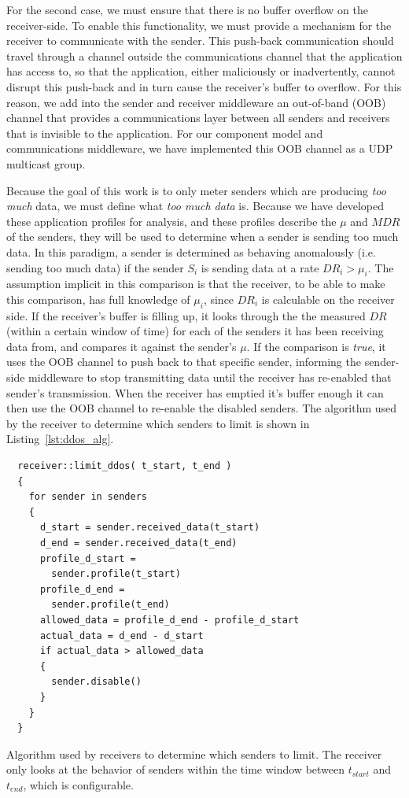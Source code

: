 For the second case, we must ensure that there is no buffer overflow
on the receiver-side.  To enable this functionality, we must provide a
mechanism for the receiver to communicate with the sender.  This
push-back communication should travel through a channel outside the
communications channel that the application has access to, so that the
application, either maliciously or inadvertently, cannot disrupt this
push-back and in turn cause the receiver's buffer to overflow.  For
this reason, we add into the sender and receiver middleware an
out-of-band (OOB) channel that provides a communications layer between
all senders and receivers that is invisible to the application.  For
our component model and communications middleware, we have implemented
this OOB channel as a UDP multicast group.

Because the goal of this work is to only meter senders which are
producing \emph{too much} data, we must define what \emph{too much
  data} is.  Because we have developed these application profiles for
analysis, and these profiles describe the $\mu$ and $MDR$ of the
senders, they will be used to determine when a sender is sending too
much data.  In this paradigm, a sender is determined as behaving
anomalously (i.e. sending too much data) if the sender $S_i$ is
sending data at a rate $DR_i > \mu_i$.  The assumption implicit in
this comparison is that the receiver, to be able to make this
comparison, has full knowledge of $\mu_i$, since $DR_i$ is calculable
on the receiver side.  If the receiver's buffer is filling up, it
looks through the the measured $DR$ (within a certain window of time)
for each of the senders it has been receiving data from, and compares
it against the sender's $\mu$.  If the comparison is \emph{true}, it
uses the OOB channel to push back to that specific sender, informing
the sender-side middleware to stop transmitting data until the
receiver has re-enabled that sender's transmission.  When the receiver
has emptied it's buffer enough it can then use the OOB channel to
re-enable the disabled senders.  The algorithm used by the receiver to
determine which senders to limit is shown in Listing~\ref{lst:ddos_alg}.

\begin{listing}[ht!]
  \begin{verbatim}
  receiver::limit_ddos( t_start, t_end )
  {
    for sender in senders
    {
      d_start = sender.received_data(t_start)
      d_end = sender.received_data(t_end)
      profile_d_start =
        sender.profile(t_start)
      profile_d_end =
        sender.profile(t_end)
      allowed_data = profile_d_end - profile_d_start
      actual_data = d_end - d_start
      if actual_data > allowed_data
      {
        sender.disable()
      }
    }
  }
  \end{verbatim}
  \caption{Algorithm used by receivers to determine which senders to
    limit.  The receiver only looks at the behavior of senders within
    the time window between $t_{start}$ and $t_{end}$, which is
    configurable.}
  \label{lst:ddos_alg}
\end{listing}


